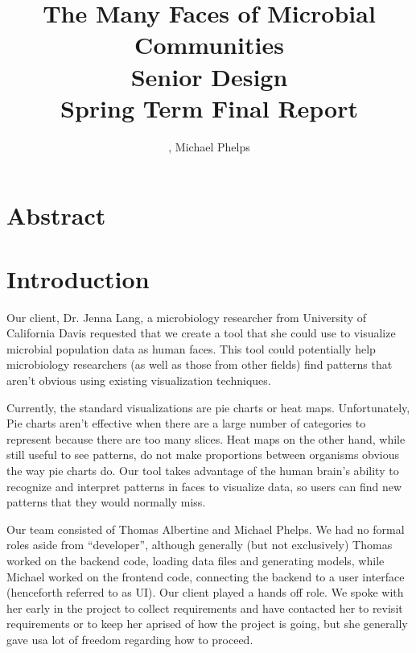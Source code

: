 \documentclass[letterpaper,10pt, onecolumn, draftclsnofoot]{IEEEtran}
\title{The Many Faces of Microbial Communities \\\large Senior Design\\Spring Term Final Report\\}
\author{\name, Michael Phelps}
\begin{document}
\maketitle
\section{Abstract}

\clearpage

\tableofcontents

\section{Introduction}
Our client, Dr. Jenna Lang, a microbiology researcher from University of California Davis requested that we create a tool that she could use to visualize microbial population data as human faces. This tool could potentially help microbiology researchers (as well as those from other fields) find patterns that aren't obvious using existing visualization techniques. 

Currently, the standard visualizations are pie charts or heat maps. Unfortunately, Pie charts aren't effective when there are a large number of categories to represent because there are too many slices. Heat maps on the other hand, while still useful to see patterns, do not make proportions between organisms obvious the way pie charts do. Our tool takes advantage of the human brain's ability to recognize and interpret patterns in faces to visualize data, so users can find new patterns that they would normally miss.

Our team consisted of Thomas Albertine and Michael Phelps. We had no formal roles aside from ``developer'', although generally (but not exclusively) Thomas worked on the backend code, loading data files and generating models, while Michael worked on the frontend code, connecting the backend to a user interface (henceforth referred to as UI). Our client played a hands off role. We spoke with her early in the project to collect requirements and have contacted her to revisit requirements or to keep her aprised of how the project is going, but she generally gave usa lot of freedom regarding how to proceed.
\end{document}
